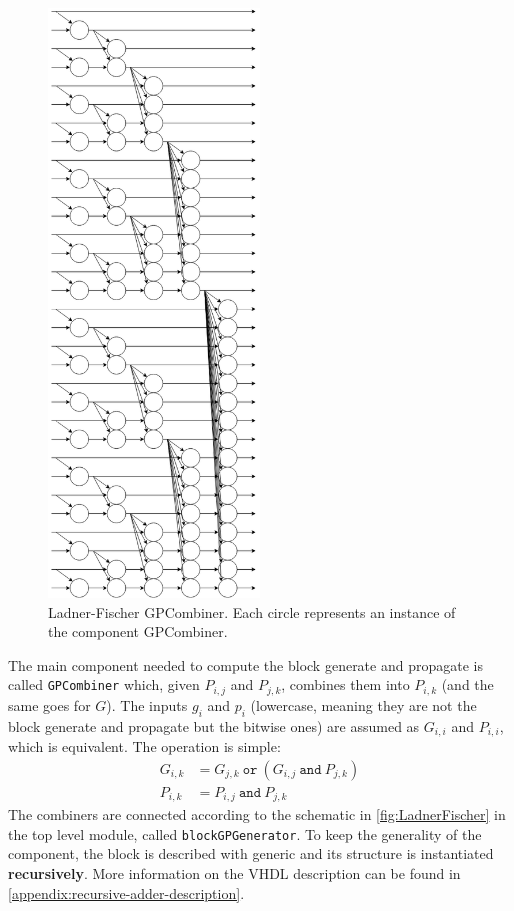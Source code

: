 \begin{enumerate}
    \begin{figure}[htbp]
        \center
    	\includegraphics[width=0.5\textwidth]{./2-implementation/images/LadnerFischer.png}
    	\caption{Ladner-Fischer GPCombiner. Each circle represents an instance of the component GPCombiner.}
    	\label{fig:LadnerFischer}
    \end{figure}
    The main component needed to compute the block generate and propagate is called \texttt{GPCombiner} which, given
    $P_{i, j}$ and $P_{j, k}$, combines them into $P_{i, k}$ (and the same goes for $G$). The inputs $g_i$ and $p_i$
    (lowercase, meaning they are not the block generate and propagate but the bitwise ones) are assumed as $G_{i, i}$
    and $P_{i, i}$, which is equivalent. The operation is simple:
    \begin{align*}
        G_{i, k} &= G_{j, k}\ \texttt{or}\  \left( G_{i, j}\ \texttt{and}\ P_{j, k} \right) \\
        P_{i, k} &= P_{i, j}\ \texttt{and}\ P_{j, k}
    \end{align*}
    The combiners are connected according to the schematic in \autoref{fig:LadnerFischer} in the top level module,
    called \texttt{blockGPGenerator}. To keep the generality of the component, the block is described with generic
    and its structure is instantiated \textbf{recursively}. More information on the VHDL description can be found in
    \autoref{appendix:recursive-adder-description}.


\end{enumerate}
